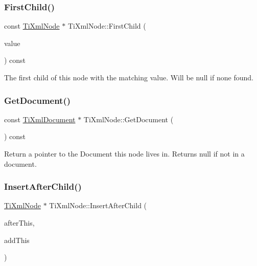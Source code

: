 \subsubsection{\texorpdfstring{First\+Child()}{FirstChild()}}
{\footnotesize\ttfamily const \hyperlink{class_ti_xml_node}{Ti\+Xml\+Node} $\ast$ Ti\+Xml\+Node\+::\+First\+Child (\begin{DoxyParamCaption}\item[{const char $\ast$}]{value }\end{DoxyParamCaption}) const}

The first child of this node with the matching \textquotesingle{}value\textquotesingle{}. Will be null if none found. \hypertarget{class_ti_xml_node_adcb070acefcbaedaa0673d82e530538b}{}\label{class_ti_xml_node_adcb070acefcbaedaa0673d82e530538b} 
\subsubsection{\texorpdfstring{Get\+Document()}{GetDocument()}}
{\footnotesize\ttfamily const \hyperlink{class_ti_xml_document}{Ti\+Xml\+Document} $\ast$ Ti\+Xml\+Node\+::\+Get\+Document (\begin{DoxyParamCaption}{ }\end{DoxyParamCaption}) const}

Return a pointer to the Document this node lives in. Returns null if not in a document. \hypertarget{class_ti_xml_node_a274db3292218202805c093f66a964cb5}{}\label{class_ti_xml_node_a274db3292218202805c093f66a964cb5} 
\subsubsection{\texorpdfstring{Insert\+After\+Child()}{InsertAfterChild()}}
{\footnotesize\ttfamily \hyperlink{class_ti_xml_node}{Ti\+Xml\+Node} $\ast$ Ti\+Xml\+Node\+::\+Insert\+After\+Child (\begin{DoxyParamCaption}\item[{\hyperlink{class_ti_xml_node}{Ti\+Xml\+Node} $\ast$}]{after\+This,  }\item[{const \hyperlink{class_ti_xml_node}{Ti\+Xml\+Node} \&}]{add\+This }\end{DoxyParamCaption})}

